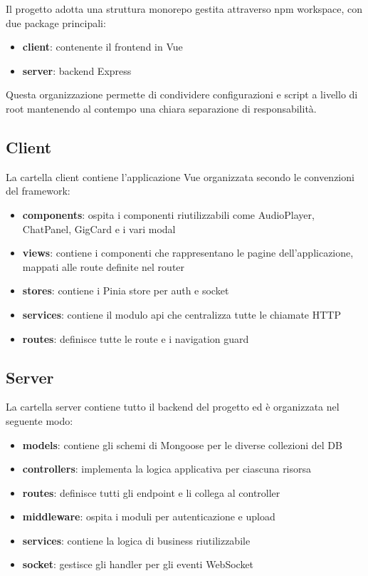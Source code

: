 \documentclass{report}
\begin{document}
Il progetto adotta una struttura monorepo gestita attraverso npm workspace, con due package principali:
\begin{itemize}
    \item \textbf{client}: contenente il frontend in Vue
    \item \textbf{server}: backend Express
\end{itemize}

Questa organizzazione permette di condividere configurazioni e script a livello di root mantenendo al contempo una chiara separazione di responsabilità.

\subsection{Client}

La cartella client contiene l'applicazione Vue organizzata secondo le convenzioni del framework:
\begin{itemize}
    \item \textbf{components}: ospita i componenti riutilizzabili come AudioPlayer, ChatPanel, GigCard e i vari modal
    \item \textbf{views}: contiene i componenti che rappresentano le pagine dell'applicazione, mappati alle route definite nel router
    \item \textbf{stores}: contiene i Pinia store per auth e socket
    \item \textbf{services}: contiene il modulo api che centralizza tutte le chiamate HTTP
    \item \textbf{routes}: definisce tutte le route e i navigation guard
\end{itemize}

\subsection{Server}

La cartella server contiene tutto il backend del progetto ed è organizzata nel seguente modo:
\begin{itemize}
    \item \textbf{models}: contiene gli schemi di Mongoose per le diverse collezioni del DB
    \item \textbf{controllers}: implementa la logica applicativa per ciascuna risorsa
    \item \textbf{routes}: definisce tutti gli endpoint e li collega al controller
    \item \textbf{middleware}: ospita i moduli per autenticazione e upload
    \item \textbf{services}: contiene la logica di business riutilizzabile
    \item \textbf{socket}: gestisce gli handler per gli eventi WebSocket
\end{itemize}
\end{document}
